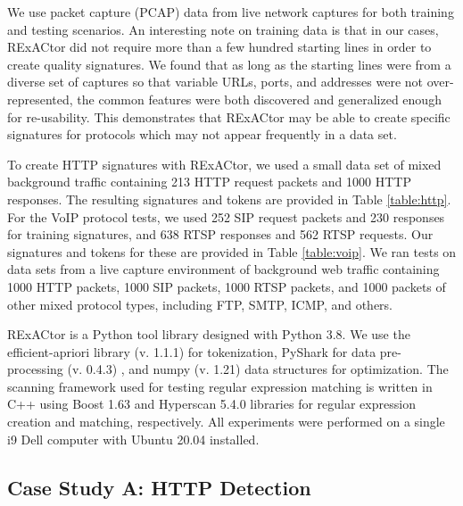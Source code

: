 We use packet capture (PCAP) data from live network captures for both training and testing scenarios. An interesting note on training data is that in our cases, RExACtor did not require more than a few hundred starting lines in order to create quality signatures. We found that as long as the starting lines were from a diverse set of captures so that variable URLs, ports, and addresses were not over-represented, the common features were both discovered and generalized enough for re-usability. This demonstrates that RExACtor may be able to create specific signatures for protocols which may not appear frequently in a data set.

To create HTTP signatures with RExACtor, we used a small data set of mixed background traffic containing 213 HTTP request packets and 1000 HTTP responses. The resulting signatures and tokens are provided in Table \ref{table:http}. For the VoIP protocol tests, we used 252 SIP request packets and 230 responses for training signatures, and 638 RTSP responses and 562 RTSP requests. Our signatures and tokens for these are provided in Table \ref{table:voip}. We ran tests on data sets from a live capture environment of background web traffic containing 1000 HTTP packets, 1000 SIP packets, 1000 RTSP packets, and 1000 packets of other mixed protocol types, including FTP, SMTP, ICMP, and others.

RExACtor is a Python tool library designed with Python 3.8. We use the efficient-apriori library (v. 1.1.1) \cite{efficient-apriori} for tokenization, PyShark for data pre-processing (v. 0.4.3) \cite{pyshark}, and numpy (v. 1.21) \cite{numpy} data structures for optimization.  The scanning framework used for testing regular expression matching is written in C++ using Boost 1.63 \cite{boost} and Hyperscan 5.4.0 \cite{hyperscan} libraries for regular expression creation and matching, respectively. All experiments were performed on a single i9 Dell computer with Ubuntu 20.04 installed.

\subsection{Case Study A: HTTP Detection}

